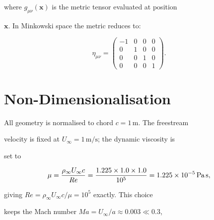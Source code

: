 \documentclass{article}
\begin{document}
where $g_{\mu\nu}(\mathbf{x})$ is the metric tensor evaluated at position

$\mathbf{x}$.  In Minkowski space the metric reduces to:



\begin{equation}

  \eta_{\mu\nu} =

  \begin{pmatrix}

    -1 & 0 & 0 & 0 \\

     0 & 1 & 0 & 0\\

     0 & 0 & 1 & 0\\

     0 & 0 & 0 & 1

  \end{pmatrix}.

  \label{eq:minkowski}

\end{equation}




\section{Non-Dimensionalisation}




All geometry is normalised to chord $c = 1\,\text{m}$.  The freestream

velocity is fixed at $U_\infty = 1\,\text{m/s}$; the dynamic viscosity is

set to



\begin{equation}

  \mu = \frac{\rho_\infty U_\infty c}{Re}

      = \frac{1.225 \times 1.0 \times 1.0}{10^5}

      = 1.225 \times 10^{-5}\,\text{Pa\,s},

\end{equation}



giving $Re = \rho_\infty U_\infty c / \mu = 10^5$ exactly.  This choice

keeps the Mach number $Ma = U_\infty / a \approx 0.003 \ll 0.3$,
\end{document}
